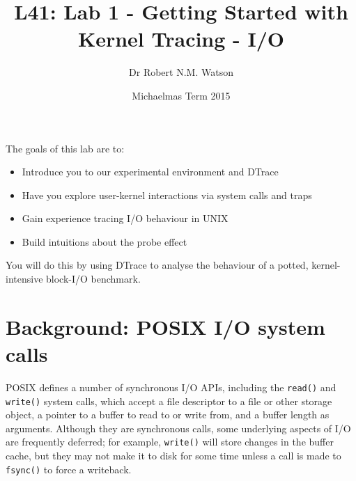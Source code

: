 \documentclass[a4paper,10pt]{article}
\begin{document}
\title{L41: Lab 1 - Getting Started with Kernel Tracing - I/O}
\author{Dr Robert N.M. Watson}
\date{Michaelmas Term 2015}
\maketitle

%
%
%

\noindent
The goals of this lab are to:

\begin{itemize}
\item Introduce you to our experimental environment and DTrace
\item Have you explore user-kernel interactions via system calls and traps
\item Gain experience tracing I/O behaviour in UNIX
\item Build intuitions about the probe effect
\end{itemize}

\noindent
You will do this by using DTrace to analyse the behaviour of a potted,
kernel-intensive block-I/O benchmark.


\section*{Background: POSIX I/O system calls}

POSIX defines a number of synchronous I/O APIs, including the
\texttt{read()} and \texttt{write()} system calls, which accept a file
descriptor to a file or other storage object, a pointer to a buffer to read to
or write from, and a buffer length as arguments.
Although they are synchronous calls, some underlying aspects of I/O are
frequently deferred; for example, \texttt{write()} will store changes in the
buffer cache, but they may not make it to disk for some time unless a call is
made to \texttt{fsync()} to force a writeback.
\end{document}
